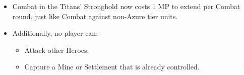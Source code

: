 \begin{itemize}
    \item Combat in the Titans' Stronghold now costs 1 MP to extend per Combat round, just like Combat against non-Azure tier units.
    \item Additionally, no player can:
    \begin{itemize}
        \item Attack other Heroes.
        \item Capture a Mine or Settlement that is already controlled.
    \end{itemize}
\end{itemize}

\newpage

